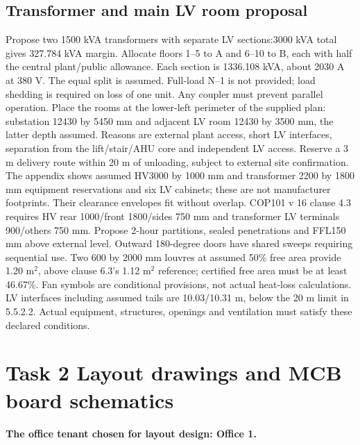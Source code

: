 \documentclass[11pt]{article}
\newcommand{\task}[1]{\section*{#1}}
\begin{document}
\subsection*{Transformer and main LV room proposal}
Propose two 1500 kVA transformers with separate LV sections:3000 kVA total gives 327.784 kVA margin. Allocate floors 1--5 to A and 6--10 to B, each with half the central plant/public allowance. Each section is 1336.108 kVA, about 2030 A at 380 V. The equal split is assumed. Full-load N--1 is not provided;  load shedding is required on loss of one unit. Any coupler must prevent parallel operation.
Place the rooms at the lower-left perimeter of the supplied plan: substation 12430 by 5450 mm and adjacent LV room 12430 by 3500 mm, the latter depth assumed. Reasons are external plant access, short LV interfaces, separation from the lift/stair/AHU core and independent LV access. Reserve a 3 m delivery route within 20 m of unloading, subject to external site confirmation.
The appendix shows assumed HV3000 by 1000 mm and transformer 2200 by 1800 mm equipment reservations and six LV cabinets;  these are not manufacturer footprints. Their clearance envelopes fit without overlap. COP101 v 16 clause 4.3 requires HV rear 1000/front 1800/sides 750 mm and transformer LV terminals 900/others 750 mm. Propose 2-hour partitions, sealed penetrations and FFL150 mm above external level. Outward 180-degree doors have shared sweeps requiring sequential use.
Two 600 by 2000 mm louvres at assumed 50\% free area provide 1.20 m$^2$, above clause 6.3's 1.12 m$^2$ reference;  certified free area must be at least 46.67\%. Fan symbols are conditional provisions, not actual heat-loss calculations. LV interfaces including assumed tails are 10.03/10.31 m, below the 20 m limit in 5.5.2.2. Actual equipment, structures, openings and ventilation must satisfy these declared conditions.
\task{Task 2 Layout drawings and MCB board schematics}
\textbf{The office tenant chosen for layout design: Office 1.}
\end{document}
